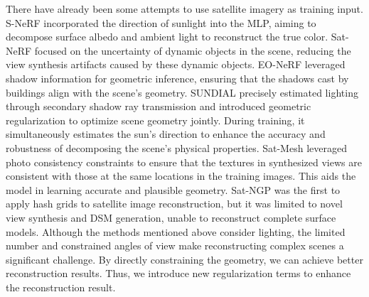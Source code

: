 There have already been some attempts to use satellite imagery as training input. S-NeRF\cite{kangle2021dsnerf} incorporated the direction of sunlight into the MLP, aiming to decompose surface albedo and ambient light to reconstruct the true color. Sat-NeRF\cite{mari2022sat} focused on the uncertainty of dynamic objects in the scene, reducing the view synthesis artifacts caused by these dynamic objects. EO-NeRF\cite{Mari_2023_eo} leveraged shadow information for geometric inference, ensuring that the shadows cast by buildings align with the scene's geometry. SUNDIAL\cite{behari2024sundial} precisely estimated lighting through secondary shadow ray transmission and introduced geometric regularization to optimize scene geometry jointly. During training, it simultaneously estimates the sun's direction to enhance the accuracy and robustness of decomposing the scene's physical properties. Sat-Mesh\cite{qu_sat-mesh_2023} leveraged photo consistency constraints to ensure that the textures in synthesized views are consistent with those at the same locations in the training images. This aids the model in learning accurate and plausible geometry. Sat-NGP\cite{billouard2024satngp} was the first to apply hash grids to satellite image reconstruction, but it was limited to novel view synthesis and DSM generation, unable to reconstruct complete surface models. Although the methods mentioned above consider lighting, the limited number and constrained angles of view make reconstructing complex scenes a significant challenge. By directly constraining the geometry, we can achieve better reconstruction results. Thus, we introduce new regularization terms to enhance the reconstruction result.
